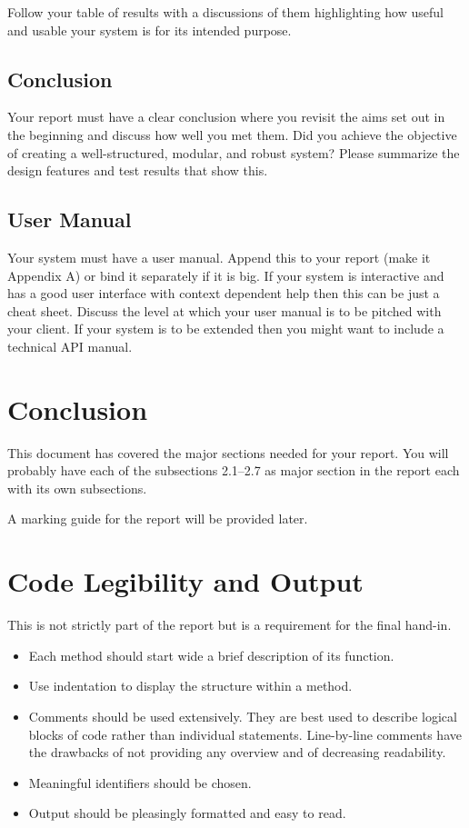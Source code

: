 \documentclass[11pt,a4paper]{article}
\begin{document}
Follow your table of results with a discussions of them highlighting
how useful and usable your system is for its intended purpose.

\subsection{Conclusion}
\label{ss:conclusion}

Your report must have a clear conclusion where you revisit the aims
set out in the beginning and discuss how well you met them. Did you
achieve the objective of creating a well-structured, modular, and
robust system?  Please summarize the design features and test results
that show this.

\subsection{User Manual}
\label{ss:user-manual}

Your system must have a user manual. Append this to your report (make
it Appendix A) or bind it separately if it is big. If your system is
interactive and has a good user interface with context dependent help
then this can be just a cheat sheet. Discuss the level at which your
user manual is to be pitched with your client. If your system is to be
extended then you might want to include a technical API manual.

\section{Conclusion}
\label{sec:conclusion}

This document has covered the major sections needed for your
report. You will probably have each of the subsections 2.1--2.7 as
major section in the report each with its own subsections. 

A marking guide for the report will be provided later.

\appendix
\section{Code Legibility and Output}

This is not strictly part of the report but is a requirement for the
final hand-in.

\begin{itemize}
\item Each method should start wide a brief description of its
  function.

\item Use indentation to display the structure within a method.

\item Comments should be used extensively. They are best used to
  describe logical blocks of code rather than individual
  statements. Line-by-line comments have the drawbacks of not
  providing any overview and of decreasing readability.

\item Meaningful identifiers should be chosen.

\item Output should be pleasingly formatted and easy to read.
\end{itemize}
\end{document}

